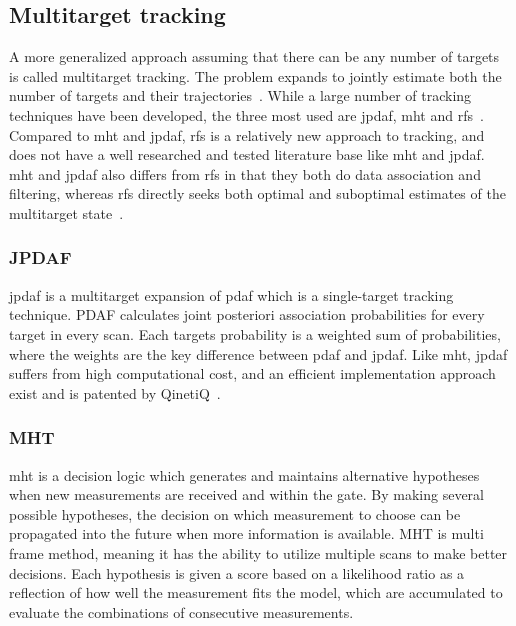 \subsection{Multitarget tracking}
A more generalized approach assuming that there can be any number of targets is called multitarget tracking. The problem expands to jointly estimate both the number of targets and their trajectories~\cite{Vo2015}. While a large number of tracking techniques have been developed, the three most used are \gls{jpdaf}, \gls{mht} and \gls{rfs}~\cite{Vo2015}. Compared to \gls{mht} and \gls{jpdaf}, \gls{rfs} is a relatively new approach to tracking, and does not have a well researched and tested literature base like \gls{mht} and \gls{jpdaf}. \gls{mht} and \gls{jpdaf} also differs from \gls{rfs} in that they both do data association and filtering, whereas \gls{rfs} directly seeks both optimal and suboptimal estimates of the multitarget state~\cite{Vo2015}.

\subsubsection{JPDAF}
\gls{jpdaf} is a multitarget expansion of \gls{pdaf} which is a single-target tracking technique. PDAF calculates joint posteriori association probabilities for every target in every scan. Each targets probability is a weighted sum of probabilities, where the weights are the key difference between \gls{pdaf} and \gls{jpdaf}. Like \gls{mht}, \gls{jpdaf} suffers from high computational cost, and an efficient implementation approach exist and is patented by QinetiQ~\cite{Horridge}.

\subsubsection{MHT}
\gls{mht} is a decision logic which generates and maintains alternative hypotheses when new \glspl{measurement} are received and within the gate. By making several possible hypotheses, the decision on which \gls{measurement} to choose can be propagated into the future when more information is available. MHT is multi frame method, meaning it has the ability to utilize multiple scans to make better decisions. Each hypothesis is given a \gls{score} based on a likelihood ratio as a reflection of how well the measurement fits the model, which are accumulated to evaluate the combinations of consecutive \glspl{measurement}.

